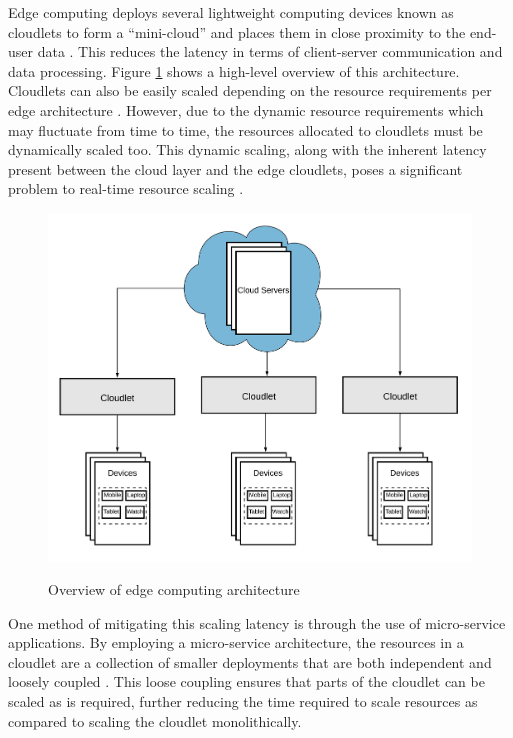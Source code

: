 Edge computing deploys several lightweight computing devices known as cloudlets to form a ``mini-cloud'' and places them in close proximity to the end-user data \cite{liu2019survey}. This reduces the latency in terms of client-server communication and data processing. Figure \ref{fig:edge-architecture-overview} shows a high-level overview of this architecture. Cloudlets can also be easily scaled depending on the resource requirements per edge architecture \cite{ren2019survey}. However, due to the dynamic resource requirements which may fluctuate from time to time, the resources allocated to cloudlets must be dynamically scaled too. This dynamic scaling, along with the inherent latency present between the cloud layer and the edge cloudlets, poses a significant problem to real-time resource scaling \cite{varghese2016challenges}.\par

\begin{figure}[htb]
    \centering
    \caption{Overview of edge computing architecture}
    \includegraphics[width=0.9\linewidth]{Figures/Edge-Architecture-Overview.png}
    \label{fig:edge-architecture-overview}
\end{figure}

One method of mitigating this scaling latency is through the use of micro-service applications. By employing a micro-service architecture, the resources in a cloudlet are a collection of smaller deployments that are both independent and loosely coupled \cite{villamizar2015evaluating}. This loose coupling ensures that parts of the cloudlet can be scaled as is required, further reducing the time required to scale resources as compared to scaling the cloudlet monolithically.\par

